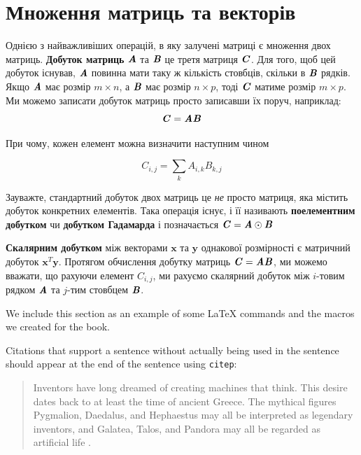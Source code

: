\section{Множення матриць та векторів}
\label{sec:multiplying}

Однією з найважливіших операцій, в яку залучені матриці є множення двох матриць. \textbf{Добуток матриць} $\textbf{\textit{A}}$ та $\textbf{\textit{B}}$ це третя матриця $\textbf{\textit{C}}$. Для того, щоб цей добуток існував, $\textbf{\textit{A}}$ повинна мати таку ж кількість стовбців, скільки в $\textbf{\textit{B}}$ рядків. Якщо $\textbf{\textit{A}}$ має розмір $m \times n$, а $\textbf{\textit{B}}$ має розмір $n \times p$, тоді $\textbf{\textit{C}}$ матиме розмір $m \times p$. Ми можемо записати добуток матриць просто записавши їх поруч, наприклад:
\begin{equation}
\textbf{\textit{C}} = \textbf{\textit{AB}}
\end{equation}

При чому, кожен елемент можна визначити наступним чином

\begin{equation}
\textit{C}_{i,j} =  \sum_{k}{\textit{A}_{i,k}\textit{B}_{k,j}}
\end{equation}

Зауважте, стандартний добуток двох матриць це \textit{не} просто матриця, яка містить добуток конкретних елементів. Така операція існує, і її називають \textbf{поелементним добутком} чи \textbf{добутком Гадамарда} і позначається $\textbf{\textit{C}} = \textbf{\textit{A}} \odot \textbf{\textit{B}}$

\textbf{Скалярним добутком} між векторами $\textbf{x}$ та $\textbf{y}$ однакової розмірності є матричний добуток $\textbf{x}^T\textbf{y}$. Протягом обчислення добутку матриць $\textbf{\textit{C}} = \textbf{\textit{AB}}$, ми можемо вважати, що рахуючи елемент $\textit{C}_{i,j}$, ми рахуємо скалярний добуток між $i$-товим рядком $\textbf{\textit{A}}$ та $j$-тим стовбцем $\textbf{\textit{B}}$.

We include this section as an example of some {\LaTeX} commands
and the macros we created for the book.

Citations that support a sentence without actually being used in the sentence
should appear at the end of the sentence using {\tt citep}:

\begin{quote}
Inventors have long dreamed of creating machines that think.
This desire dates back to at least the time of ancient Greece.
The mythical figures Pygmalion, Daedalus, and Hephaestus may
all be interpreted as legendary inventors, and
Galatea, Talos, and Pandora may all be regarded as artificial
life \citep{ovid2004metamorphoses,sparkes1996red,1997works}.
\end{quote}

